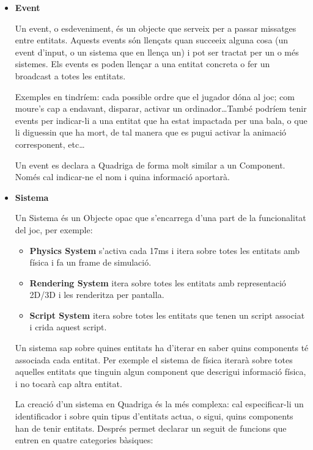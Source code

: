 \begin{itemize}
    \item{\bf Event}

      Un event, o esdeveniment, és un objecte que serveix per a passar missatges entre entitats. Aquests events són llençats quan succeeix alguna cosa (un event d'input, o un sistema que en llença un) i pot ser tractat per un o més sistemes. Els events es poden llençar a una entitat concreta o fer un broadcast a totes les entitats.
      
      Exemples en tindríem: cada possible ordre que el jugador dóna al joc; com moure's cap a endavant, disparar, activar un ordinador\ldots També podríem tenir events per indicar-li a una entitat que ha estat impactada per una bala, o que li diguessin que ha mort, de tal manera que es pugui activar la animació corresponent, etc\ldots

      Un event es declara a Quadriga de forma molt similar a un Component. Només cal indicar-ne el nom i quina informació aportarà.

    \item{\bf Sistema}

      Un Sistema és un Objecte opac que s'encarrega d'una part de la funcionalitat del joc, per exemple:
      \begin{itemize}
        \item{\bf Physics System} s'activa cada 17ms i itera sobre totes les entitats amb física i fa un frame de simulació.
        \item{\bf Rendering System} itera sobre totes les entitats amb representació 2D/3D i les renderitza per pantalla.
        \item{\bf Script System} itera sobre totes les entitats que tenen un script associat i crida aquest script.
      \end{itemize}

      Un sistema sap sobre quines entitats ha d'iterar en saber quins components té associada cada entitat. Per exemple el sistema de física iterarà sobre totes aquelles entitats que tinguin algun component que descrigui informació física, i no tocarà cap altra entitat.

      La creació d'un sistema en Quadriga és la més complexa: cal especificar-li un identificador i sobre quin tipus d'entitats actua, o sigui, quins components han de tenir entitats. Després permet declarar un seguit de funcions que entren en quatre categories bàsiques:
      

\end{itemize}
